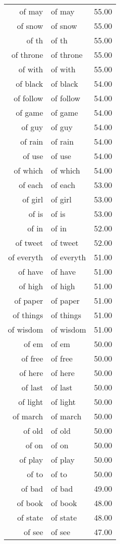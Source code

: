 \begin{table}[ht]
\begin{tabular}{rlr}
  of may & of may & 55.00 \\ 
  of snow & of snow & 55.00 \\ 
  of th & of th & 55.00 \\ 
  of throne & of throne & 55.00 \\ 
  of with & of with & 55.00 \\ 
  of black & of black & 54.00 \\ 
  of follow & of follow & 54.00 \\ 
  of game & of game & 54.00 \\ 
  of guy & of guy & 54.00 \\ 
  of rain & of rain & 54.00 \\ 
  of use & of use & 54.00 \\ 
  of which & of which & 54.00 \\ 
  of each & of each & 53.00 \\ 
  of girl & of girl & 53.00 \\ 
  of is & of is & 53.00 \\ 
  of in & of in & 52.00 \\ 
  of tweet & of tweet & 52.00 \\ 
  of everyth & of everyth & 51.00 \\ 
  of have & of have & 51.00 \\ 
  of high & of high & 51.00 \\ 
  of paper & of paper & 51.00 \\ 
  of things & of things & 51.00 \\ 
  of wisdom & of wisdom & 51.00 \\ 
  of em & of em & 50.00 \\ 
  of free & of free & 50.00 \\ 
  of here & of here & 50.00 \\ 
  of last & of last & 50.00 \\ 
  of light & of light & 50.00 \\ 
  of march & of march & 50.00 \\ 
  of old & of old & 50.00 \\ 
  of on & of on & 50.00 \\ 
  of play & of play & 50.00 \\ 
  of to & of to & 50.00 \\ 
  of bad & of bad & 49.00 \\ 
  of book & of book & 48.00 \\ 
  of state & of state & 48.00 \\ 
  of see & of see & 47.00 \\ 

\end{tabular}
\end{table}
